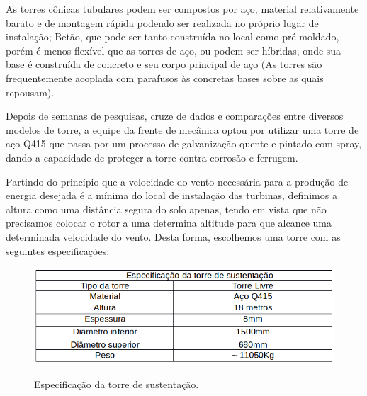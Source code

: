    As torres cônicas tubulares podem ser compostos por aço, material relativamente barato e de montagem rápida podendo ser realizada no próprio lugar de instalação; Betão, que pode ser tanto construída no local como pré-moldado, porém é menos flexível que as torres de aço, ou podem ser híbridas, onde sua base é construída de concreto  e seu corpo principal de aço (As torres são frequentemente acoplada com parafusos às concretas bases sobre as quais repousam). \footnotemark
   
   Depois de semanas de pesquisas, cruze de dados e comparações entre diversos modelos de torre, a equipe da frente de mecânica optou por utilizar uma torre de aço Q415 que passa por um processo de galvanização quente e pintado com spray, dando a capacidade de proteger a torre contra corrosão e ferrugem. \footnotemark
   
   Partindo do princípio que a velocidade do vento necessária para a produção de energia desejada é a mínima do local de instalação das turbinas, definimos a altura como uma distância segura do solo apenas, tendo em vista que não precisamos colocar o rotor a uma determina altitude para que alcance uma determinada velocidade do vento. Desta forma, escolhemos uma torre com as seguintes especificações: 
   
   \begin{figure}[!h]
    \centering
    \includegraphics[scale = 0.5]{editaveis/figuras/torre_spec}
    \label{torre_spec}
    \caption[Especificação da torre de sustentação]{Especificação da torre de sustentação. \footnotemark}
   \end{figure}
   \FloatBarrier
   
